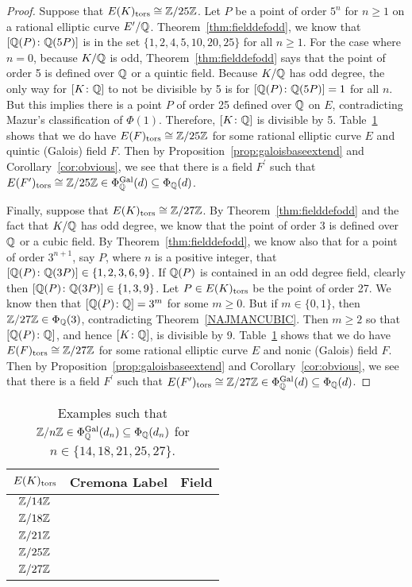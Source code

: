 \begin{proof}
Suppose that $E(K)_{\text{tors}} \cong \mathbb{Z}/25\mathbb{Z}$. Let $P$ be a point of order $5^n$ for $n \geq 1$ on a rational elliptic curve $E^\prime/\mathbb{Q}$. Theorem~\ref{thm:fielddefodd}, we know that $[\mathbb{Q}(P) \colon \mathbb{Q}(5P)]$ is in the set $\{ 1, 2, 4, 5, 10, 20, 25 \}$ for all $n \geq 1$. For the case where $n= 0$, because $K/\mathbb{Q}$ is odd, Theorem~\ref{thm:fielddefodd} says that the point of order 5 is defined over $\mathbb{Q}$ or a quintic field. Because $K/\mathbb{Q}$ has odd degree, the only way for $[K \colon \mathbb{Q}]$ to not be divisible by 5 is for $[\mathbb{Q}(P) \colon \mathbb{Q}(5P)]= 1$ for all $n$. But this implies there is a point $P$ of order 25 defined over $\mathbb{Q}$ on $E$, contradicting Mazur's classification of $\Phi(1)$. Therefore, $[K \colon \mathbb{Q}]$ is divisible by 5. Table~\ref{tab:fincompexamples} shows that we do have $E(F)_{\text{tors}} \cong \mathbb{Z}/25\mathbb{Z}$ for some rational elliptic curve $E$ and quintic (Galois) field $F$. Then by Proposition~\ref{prop:galoisbaseextend} and Corollary~\ref{cor:obvious}, we see that there is a field $F^\prime$ such that $E(F^\prime)_{\text{tors}} \cong \mathbb{Z}/25\mathbb{Z} \in \Phi_{\mathbb{Q}}^{\operatorname{Gal}}(d) \subseteq \Phi_{\mathbb{Q}}(d)$.  

Finally, suppose that $E(K)_{\text{tors}} \cong \mathbb{Z}/27\mathbb{Z}$. By Theorem~\ref{thm:fielddefodd} and the fact that $K/\mathbb{Q}$ has odd degree, we know that the point of order 3 is defined over $\mathbb{Q}$ or a cubic field. By Theorem~\ref{thm:fielddefodd}, we know also that for a point of order $3^{n+1}$, say $P$, where $n$ is a positive integer, that $[\mathbb{Q}(P) \colon \mathbb{Q}(3P)] \in \{ 1, 2, 3, 6, 9 \}$. If $\mathbb{Q}(P)$ is contained in an odd degree field, clearly then $[\mathbb{Q}(P) \colon \mathbb{Q}(3P)] \in \{ 1, 3, 9 \}$. Let $P \in E(K)_{\text{tors}}$ be the point of order 27. We know then that $[\mathbb{Q}(P) \colon \mathbb{Q}]= 3^m$ for some $m \geq 0$. But if $m \in \{ 0, 1 \}$, then $\mathbb{Z}/27\mathbb{Z} \in \Phi_{\mathbb{Q}}(3)$, contradicting Theorem~\ref{NAJMANCUBIC}. Then $m \geq 2$ so that $[\mathbb{Q}(P) \colon \mathbb{Q}]$, and hence $[K \colon \mathbb{Q}]$, is divisible by 9. Table~\ref{tab:fincompexamples} shows that we do have $E(F)_{\text{tors}} \cong \mathbb{Z}/27\mathbb{Z}$ for some rational elliptic curve $E$ and nonic (Galois) field $F$. Then by Proposition~\ref{prop:galoisbaseextend} and Corollary~\ref{cor:obvious}, we see that there is a field $F^\prime$ such that $E(F^\prime)_{\text{tors}} \cong \mathbb{Z}/27\mathbb{Z} \in \Phi_{\mathbb{Q}}^{\operatorname{Gal}}(d) \subseteq \Phi_{\mathbb{Q}}(d)$.  
\end{proof}


	\begin{table}[!ht]
	\centering
	\caption{Examples such that $\mathbb{Z}/n\mathbb{Z} \in \Phi_{\mathbb{Q}}^{\operatorname{Gal}}(d_n) \subseteq \Phi_{\mathbb{Q}}(d_n)$ for $n \in \{ 14, 18, 21, 25, 27 \}$.\label{tab:fincompexamples}}
	\begin{tabular}{ccc} \hline
	$E(K)_{\text{tors}}$ & Cremona Label & Field \\ \hline
	$\mathbb{Z}/14\mathbb{Z}$ & \fnaf{} & \qzetasp{} \\ 
	$\mathbb{Z}/18\mathbb{Z}$ & \ffasix{} & \qzetasp{} \\
	$\mathbb{Z}/21\mathbb{Z}$ & \ostbo{} & \qzetanp{} \\ 
	$\mathbb{Z}/25\mathbb{Z}$ & \eeat{} & \qzetaeep{} \\
	$\mathbb{Z}/27\mathbb{Z}$ & \tsaf{} & \qzetatsp{} 
	\end{tabular}
	\end{table}


